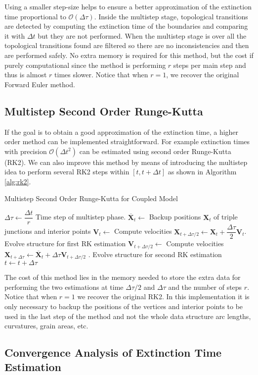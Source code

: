 Using a smaller step-size helps to ensure a better approximation of the extinction time proportional to $\mathcal{O}(\Delta \tau)$.
Inside the multistep stage, topological transitions are detected by computing the extinction time of the boundaries and comparing it with $\Delta t$ but they are not performed. When the multistep stage is over all the topological transitions found are filtered so there are no inconsistencies and then are performed safely. No extra memory is required for this method, but the cost if purely computational since the method is performing $r$ steps per main step and thus is almost $r$ times slower.  Notice that when $r = 1$, we recover the original Forward Euler method.

\subsection{Multistep Second Order Runge-Kutta}

If the goal is to obtain a good approximation of the extinction time, a higher order method can be implemented straightforward. For example extinction times with precision $\mathcal{O}(\Delta t^2)$ can be estimated using second order Runge-Kutta (RK2). We can also improve this method by means of introducing the multistep idea to perform several RK2 steps within $[t,t+\Delta t]$ as shown in Algorithm \ref{alg:rk2}.

\begin{algorithm}
\caption{Multistep Second Order Runge-Kutta for Coupled Model}
\label{alg:rk2}
\begin{algorithmic}[1]
\State $\Delta \tau \gets \dfrac{\Delta t}{r}$ Time step of multistep phase.
\State $\mathbf{\overline{X}}_t \gets$ Backup positions $\mathbf{X}_t$ of triple junctions and interior points
\State $\mathbf{V}_t \gets$ Compute velocities
\State $\mathbf{X}_{t + \Delta \tau / 2} \gets \mathbf{X}_t + \dfrac{\Delta \tau}{2} \mathbf{V}_t$. Evolve structure for first RK estimation
\State $\mathbf{V}_{t + \Delta \tau /2} \gets$ Compute velocities
\State $\mathbf{X}_{t + \Delta \tau} \gets \mathbf{\overline{X}}_t + \Delta \tau \mathbf{V}_{t + \Delta \tau /2}$ . Evolve structure for second RK estimation
\State $t \gets t + \Delta \tau$
\EndFor
\EndProcedure
\end{algorithmic}
\end{algorithm}

The cost of this method lies in the memory needed to store the extra data for performing the two estimations at time $\Delta \tau/2$ and $\Delta \tau$ and the number of steps $r$. Notice that when $r = 1$  we recover the original RK2. In this implementation it is only necessary to backup the positions of the vertices and interior points to be used in the last step of the method and not the whole data structure \ie arc lengths, curvatures, grain areas, etc.

\subsection{Convergence Analysis of Extinction Time Estimation}
